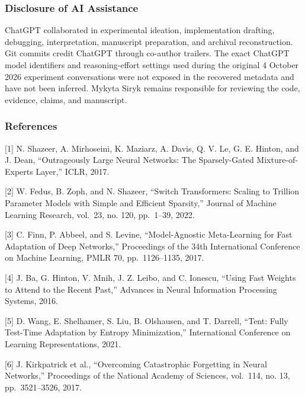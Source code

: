 \documentclass[
  10pt,
]{article}
\begin{document}
\hypertarget{disclosure-of-ai-assistance}{%
\subsubsection{Disclosure of AI
Assistance}\label{disclosure-of-ai-assistance}}

ChatGPT collaborated in experimental ideation, implementation drafting,
debugging, interpretation, manuscript preparation, and archival
reconstruction. Git commits credit ChatGPT through co-author trailers.
The exact ChatGPT model identifiers and reasoning-effort settings used
during the original 4 October 2026 experiment conversations were not
exposed in the recovered metadata and have not been inferred. Mykyta
Siryk remains responsible for reviewing the code, evidence, claims, and
manuscript.

\hypertarget{references}{%
\subsubsection{References}\label{references}}

{[}1{]} N. Shazeer, A. Mirhoseini, K. Maziarz, A. Davis, Q. V. Le, G. E.
Hinton, and J. Dean, ``Outrageously Large Neural Networks: The
Sparsely-Gated Mixture-of-Experts Layer,'' ICLR, 2017.

{[}2{]} W. Fedus, B. Zoph, and N. Shazeer, ``Switch Transformers:
Scaling to Trillion Parameter Models with Simple and Efficient
Sparsity,'' Journal of Machine Learning Research, vol.~23, no. 120,
pp.~1--39, 2022.

{[}3{]} C. Finn, P. Abbeel, and S. Levine, ``Model-Agnostic
Meta-Learning for Fast Adaptation of Deep Networks,'' Proceedings of the
34th International Conference on Machine Learning, PMLR 70,
pp.~1126--1135, 2017.

{[}4{]} J. Ba, G. Hinton, V. Mnih, J. Z. Leibo, and C. Ionescu, ``Using
Fast Weights to Attend to the Recent Past,'' Advances in Neural
Information Processing Systems, 2016.

{[}5{]} D. Wang, E. Shelhamer, S. Liu, B. Olshausen, and T. Darrell,
``Tent: Fully Test-Time Adaptation by Entropy Minimization,''
International Conference on Learning Representations, 2021.

{[}6{]} J. Kirkpatrick et al., ``Overcoming Catastrophic Forgetting in
Neural Networks,'' Proceedings of the National Academy of Sciences,
vol.~114, no. 13, pp.~3521--3526, 2017.
\end{document}
